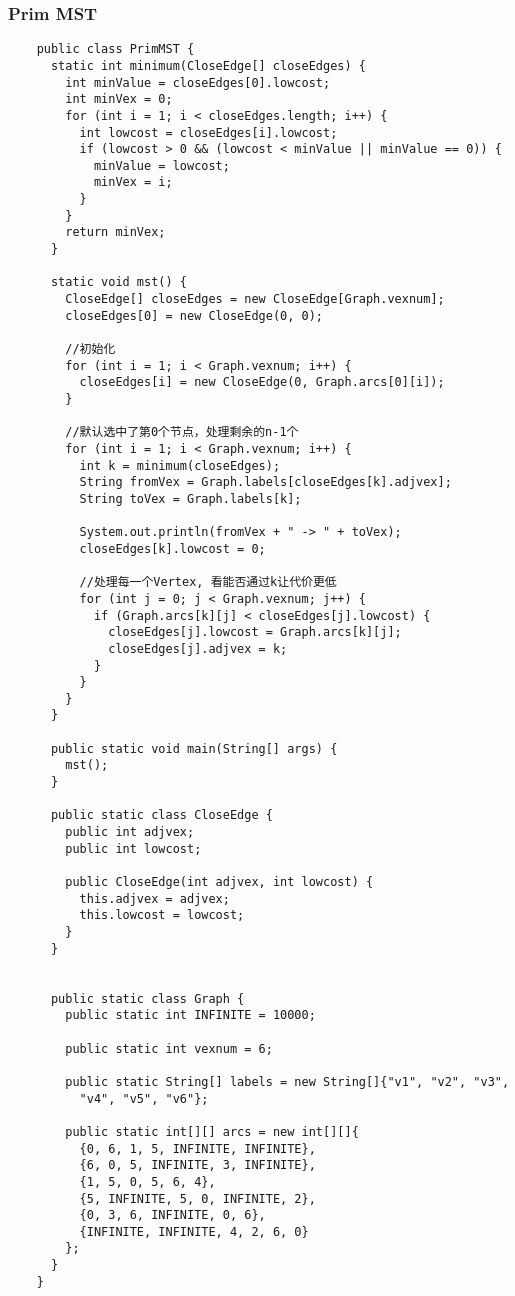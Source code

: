 \begin{frame}
  \frametitle{Prim MST}
  \begin{verbatim}
    public class PrimMST {
      static int minimum(CloseEdge[] closeEdges) {
        int minValue = closeEdges[0].lowcost;
        int minVex = 0;
        for (int i = 1; i < closeEdges.length; i++) {
          int lowcost = closeEdges[i].lowcost;
          if (lowcost > 0 && (lowcost < minValue || minValue == 0)) {
            minValue = lowcost;
            minVex = i;
          }
        }
        return minVex;
      }

      static void mst() {
        CloseEdge[] closeEdges = new CloseEdge[Graph.vexnum];
        closeEdges[0] = new CloseEdge(0, 0);

        //初始化
        for (int i = 1; i < Graph.vexnum; i++) {
          closeEdges[i] = new CloseEdge(0, Graph.arcs[0][i]);
        }

        //默认选中了第0个节点，处理剩余的n-1个
        for (int i = 1; i < Graph.vexnum; i++) {
          int k = minimum(closeEdges);
          String fromVex = Graph.labels[closeEdges[k].adjvex];
          String toVex = Graph.labels[k];

          System.out.println(fromVex + " -> " + toVex);
          closeEdges[k].lowcost = 0;

          //处理每一个Vertex, 看能否通过k让代价更低
          for (int j = 0; j < Graph.vexnum; j++) {
            if (Graph.arcs[k][j] < closeEdges[j].lowcost) {
              closeEdges[j].lowcost = Graph.arcs[k][j];
              closeEdges[j].adjvex = k;
            }
          }
        }
      }

      public static void main(String[] args) {
        mst();
      }

      public static class CloseEdge {
        public int adjvex;
        public int lowcost;

        public CloseEdge(int adjvex, int lowcost) {
          this.adjvex = adjvex;
          this.lowcost = lowcost;
        }
      }


      public static class Graph {
        public static int INFINITE = 10000;

        public static int vexnum = 6;

        public static String[] labels = new String[]{"v1", "v2", "v3",
          "v4", "v5", "v6"};

        public static int[][] arcs = new int[][]{
          {0, 6, 1, 5, INFINITE, INFINITE},
          {6, 0, 5, INFINITE, 3, INFINITE},
          {1, 5, 0, 5, 6, 4},
          {5, INFINITE, 5, 0, INFINITE, 2},
          {0, 3, 6, INFINITE, 0, 6},
          {INFINITE, INFINITE, 4, 2, 6, 0}
        };
      }
    }
  \end{verbatim}
\end{frame}

